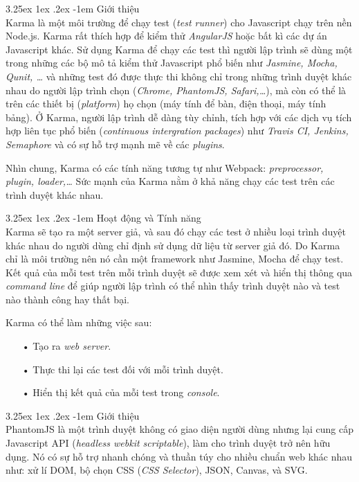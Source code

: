 \documentclass[12pt,a4paper,twoside]{article}
\makeatletter
\let\newcounter\@gobble\let\setcounter\@gobbletwo
\newcommand{\myparagraph}[1]{\paragraph{#1}\mbox{}\\} %
\newcounter{subsubsubsection}[subsubsection]
\renewcommand\paragraph{\@startsection{paragraph}{5}{\z@}%
  {3.25ex \@plus1ex \@minus.2ex}%
  {-1em}%
  {\normalfont\normalsize\bfseries}}
\makeatother
\begin{document}
\myparagraph{Giới thiệu}
Karma\cite{karma_1} là một môi trường để chạy test (\textit{test runner}) cho Javascript chạy trên nền Node.js. Karma rất thích hợp để kiểm thử \textit{AngularJS} hoặc bất kì các dự án Javascript khác. Sử dụng Karma để chạy các test thì người lập trình sẽ dùng một trong những các bộ mô tả kiểm thử Javascript phổ biến như \textit{Jasmine, Mocha, Qunit, …} và những test đó được thực thi không chỉ trong những trình duyệt khác nhau do người lập trình chọn (\textit{Chrome, PhantomJS, Safari,…}), mà còn có thể là trên các thiết bị (\textit{platform}) họ chọn (máy tính để bàn, điện thoại, máy tính bảng). Ở Karma, người lập trình dễ dàng tùy chỉnh, tích hợp với các dịch vụ tích hợp liên tục phổ biến (\textit{continuous intergration packages}) như \textit{Travis CI, Jenkins, Semaphore} và có sự hỗ trợ mạnh mẽ về các \textit{plugins}.

Nhìn chung, Karma có các tính năng tương tự như Webpack: \textit{preprocessor, plugin, loader,…} Sức mạnh của Karma nằm ở khả năng chạy các test trên các trình duyệt khác nhau. 

\myparagraph{Hoạt động và Tính năng}
Karma sẽ tạo ra một server giả, và sau đó chạy các test ở nhiều loại trình duyệt khác nhau do người dùng chỉ định sử dụng dữ liệu từ server giả đó. Do Karma chỉ là môi trường nên nó cần một framework như Jasmine, Mocha để chạy test. Kết quả của mỗi test trên mỗi trình duyệt sẽ được xem xét và hiển thị thông qua \textit{command line} để giúp người lập trình có thể nhìn thấy trình duyệt nào và test nào thành công hay thất bại.

Karma có thể làm những việc sau:
\begin{itemize}
\item[•] Tạo ra \textit{web server}.
\item[•] Thực thi lại các test đối với mỗi trình duyệt.
\item[•] Hiển thị kết quả của mỗi test trong \textit{console}.
\end{itemize}

\myparagraph{Giới thiệu}
PhantomJS là một trình duyệt không có giao diện người dùng nhưng lại cung cấp Javascript API (\textit{headless webkit scriptable}), làm cho trình duyệt trở nên hữu dụng. Nó có sự hỗ trợ nhanh chóng và thuần túy cho nhiều chuẩn web khác nhau như: xử lí DOM, bộ chọn CSS (\textit{CSS Selector}), JSON, Canvas, và SVG.
\end{document}
